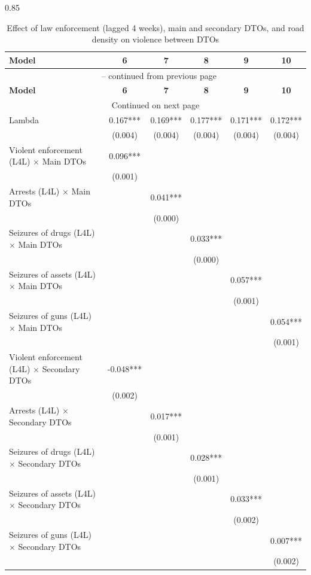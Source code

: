 \documentclass[12pt,letterpaper]{article}
\begin{document}
\begin{landscape}
\begin{center}
\begin{spacing}{0.85}
\begin{longtable}{lccccc}
\caption{Effect of law enforcement (lagged 4 weeks), main and secondary DTOs, and road density on violence between DTOs} \label{tab:enforcement_MainMinorDTOs_Road_L4L} \\

\hline 
\multicolumn{1}{l}{\textbf{Model }} &\multicolumn{1}{c}{\textbf{6}} & \multicolumn{1}{c}{\textbf{7}} & \multicolumn{1}{c}{\textbf{8}} & \multicolumn{1}{c}{\textbf{9}} & \multicolumn{1}{c}{\textbf{10}} \\ \hline 
\endfirsthead


\multicolumn{6}{c}{{\tablename\ \thetable{} -- continued from previous page}} \\ \hline
\multicolumn{1}{l}{\textbf{Model }} &\multicolumn{1}{c}{\textbf{6}} & \multicolumn{1}{c}{\textbf{7}} & \multicolumn{1}{c}{\textbf{8}} & \multicolumn{1}{c}{\textbf{9}} & \multicolumn{1}{c}{\textbf{10}} \\ \hline 
\endhead

\hline \multicolumn{6}{c}{{Continued on next page}} \\ \hline
\endfoot

\hline \hline
\endlastfoot

Lambda & 0.167*** & 0.169*** & 0.177*** & 0.171*** & 0.172*** \\ 
 & (0.004) & (0.004) & (0.004) & (0.004) & (0.004) \\ 
Violent enforcement (L4L) $\times$ Main DTOs & 0.096*** & & & & \\ 
 & (0.001) & & & & \\ 
Arrests (L4L) $\times$ Main DTOs & & 0.041*** & & & \\ 
 & & (0.000) & & & \\ 
Seizures of drugs (L4L) $\times$ Main DTOs & & & 0.033*** & & \\ 
 & & & (0.000) & & \\ 
Seizures of assets (L4L) $\times$ Main DTOs & & & & 0.057*** & \\ 
 & & & & (0.001) & \\ 
Seizures of guns (L4L) $\times$ Main DTOs & & & & & 0.054*** \\ 
 & & & & & (0.001) \\ 
 
Violent enforcement (L4L) $\times$ Secondary DTOs & -0.048*** & & & & \\ 
 & (0.002) & & & & \\ 
Arrests (L4L) $\times$ Secondary DTOs & & 0.017*** & & & \\ 
 & & (0.001) & & & \\ 
Seizures of drugs (L4L) $\times$ Secondary DTOs & & & 0.028*** & & \\ 
 & & & (0.001) & & \\ 
Seizures of assets (L4L) $\times$ Secondary DTOs & & & & 0.033*** & \\ 
 & & & & (0.002) & \\ 
Seizures of guns (L4L) $\times$ Secondary DTOs & & & & & 0.007*** \\ 
 & & & & & (0.002) \\ 
 

\end{longtable}
\end{spacing}
\end{center}
\end{landscape}
\end{document}
